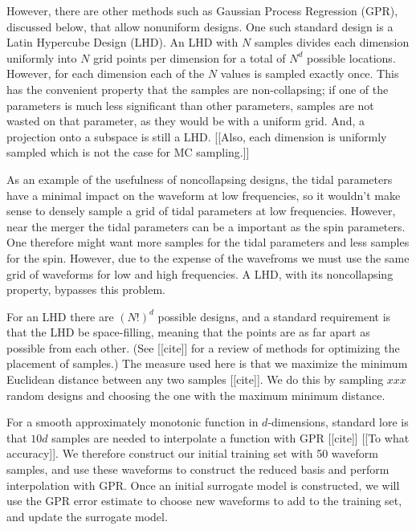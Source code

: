 \documentclass[prd,aps,letter,twocolumn,floatfix,notitlepage]{revtex4-1}
\begin{document}
However, there are other methods such as Gaussian Process Regression (GPR), discussed below, that allow nonuniform designs.
One such standard design is a Latin Hypercube Design (LHD). An LHD with $N$ samples divides each dimension uniformly into $N$
grid points per dimension for a total of $N^d$ possible locations. However, for each dimension each of the $N$ values is sampled 
exactly once. This has the convenient property that the samples are non-collapsing; if one of the parameters is much less 
significant than other parameters, samples are not wasted on that parameter, as they would be with a uniform grid. And, a projection
onto a subspace is still a LHD. [[Also, each dimension is uniformly sampled which is not the case for MC sampling.]]

As an example of the usefulness of noncollapsing designs, the tidal parameters have a minimal impact on the waveform
at low frequencies, so it wouldn't make sense to densely sample a grid of tidal parameters at low frequencies. However, near
the merger the tidal parameters can be a important as the spin parameters. One therefore might want more samples for the tidal
parameters and less samples for the spin. However, due to the expense of the wavefroms we must use the same grid of waveforms 
for low and high frequencies. A LHD, with its noncollapsing property, bypasses this problem. 

For an LHD there are $(N!)^d$ possible designs, and a standard requirement is that the LHD be space-filling, meaning that the 
points are as far apart as possible from each other. (See [[cite]] for a review of methods for optimizing the placement of samples.) 
The measure used here is that we maximize the minimum Euclidean distance between any two samples [[cite]]. We do this by 
sampling $xxx$ random designs and choosing the one with the maximum minimum distance.

For a smooth approximately monotonic function in $d$-dimensions, standard lore is that $10d$ samples are needed to interpolate 
a function with GPR [[cite]] [[To what accuracy]]. We therefore construct our initial training set with 50 waveform samples, and use 
these waveforms to construct the reduced basis and perform interpolation with GPR. Once an initial surrogate model is constructed,
we will use the GPR error estimate to choose new waveforms to add to the training set, and update the surrogate model.
\end{document}
